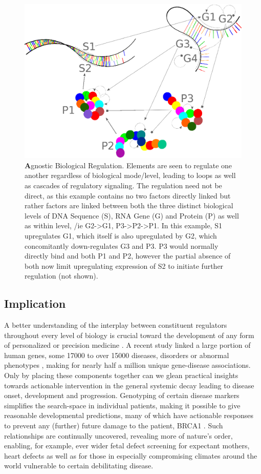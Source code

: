 \begin{figure}%
\centering
\includegraphics[width=1\linewidth]{2/DNA2.eps}
\caption{{\textbf Agnostic Biological Regulation.} Elements are seen to regulate one another regardless of biological mode/level, leading to loops as well as cascades of regulatory signaling. The regulation need not be direct, as this example contains no two factors directly linked but rather factors are linked between both the three distinct biological levels of DNA Sequence (S), RNA Gene (G) and Protein (P) as well as within level, /ie G2->G1, P3->P2->P1. In this example, S1 upregulates G1, which itself is also upregulated by G2, which concomitantly down-regulates G3 and P3. P3 would normally directly bind and  both P1 and P2, however the partial absence of both now limit upregulating expression of S2 to initiate further regulation (not shown).
}
\label{fig:DNA}
\end{figure}


\subsection{Implication}
\label{sec:practical}
A better understanding of the interplay between constituent regulators throughout every level of biology is crucial toward the development of any form of personalized or precision medicine \citep{barabasi2011network}. A recent study linked a large portion of human genes, some 17000 to over 15000 diseases, disorders or abnormal phenotypes \citep{pinero2015disgenet}, making for nearly half a million unique gene-disease associations. Only by placing these components together can we glean practical insights towards actionable intervention in the general systemic decay leading to disease onset, development and progression. Genotyping of certain disease markers simplifies the search-space in individual patients, making it possible to give reasonable developmental predictions, many of which have actionable responses to prevent any (further) future damage to the patient, \ie BRCA1 \citep{lerman1996brca1}. Such relationships are continually uncovered, revealing more of nature's order, enabling, for example, ever wider fetal defect screening for expectant mothers, \ie heart defects \citep{hyett1999using} as well as for those in especially compromising climates around the world vulnerable to certain debilitating disease.


